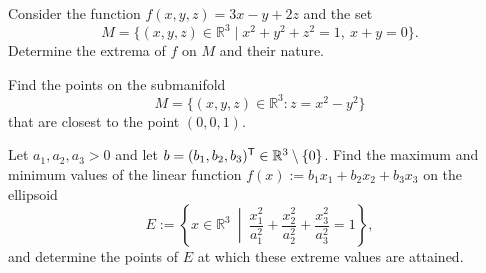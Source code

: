 
\begin{exercise}
\label{ex:lagrange_sphere_plane}
Consider the function $f(x,y,z) = 3x-y+2z$ and the set
\[M = \{(x,y,z) \in \mathbb{R}^3 \mid x^2+y^2+z^2 = 1,\ x+y = 0\}.\]
Determine the extrema of $f$ on $M$ and their nature.
\end{exercise}


\begin{exercise}
\label{ex:closest_point_hyperbolic_paraboloid}
Find the points on the submanifold
\[M = \{(x,y,z) \in \mathbb{R}^3 : z = x^2-y^2\}\]
that are closest to the point $(0,0,1)$.
\end{exercise}

\begin{exercise}
\label{ex:lagrange_ellipsoid_linear}
Let $a_1, a_2, a_3 > 0$ and let $b = (b_1, b_2, b_3)^{\mathsf{T}} \in \mathbb{R}^3 \setminus \{0\}$. Find the maximum and minimum values of the linear function $f(x) := b_1 x_1 + b_2 x_2 + b_3 x_3$ on the ellipsoid
\[E := \left\{x \in \mathbb{R}^3 \ \middle|\ \frac{x_1^2}{a_1^2} + \frac{x_2^2}{a_2^2} + \frac{x_3^2}{a_3^2} = 1\right\},\]
and determine the points of $E$ at which these extreme values are attained.
\end{exercise}

